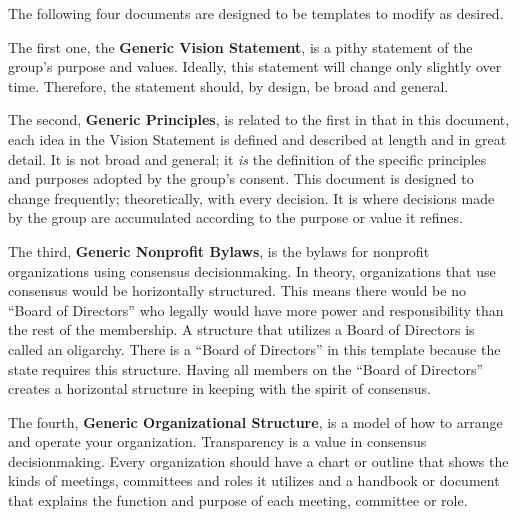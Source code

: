 
The following four documents are designed to be templates to modify as desired.
 
The first one, the \textbf{Generic Vision Statement}, is a pithy statement of the group's purpose and values. Ideally, this statement will change only slightly over time. Therefore, the statement should, by design, be broad and general.
 
The second, \textbf{Generic Principles}, is related to the first in that in this document, each idea in the Vision Statement is defined and described at length and in great detail. It is not broad and general; it \emph{is} the definition of the specific principles and purposes adopted by the group's consent. This document is designed to change frequently; theoretically, with every decision. It is where decisions made by the group are accumulated according to the purpose or value it refines.
 
The third, \textbf{Generic Nonprofit Bylaws}, is the bylaws for nonprofit organizations using consensus decisionmaking. In theory, organizations that use consensus would be horizontally structured. This means there would be no “Board of Directors” who legally would have more power and responsibility than the rest of the membership. A structure that utilizes a Board of Directors is called an oligarchy. There is a “Board of Directors” in this template because the state requires this structure. Having all members on the “Board of Directors” creates a horizontal structure in keeping with the spirit of consensus.
 
The fourth, \textbf{Generic Organizational Structure}, is a model of how to arrange and operate your organization. Transparency is a value in consensus decisionmaking. Every organization should have a chart or outline that shows the kinds of meetings, committees and roles it utilizes and a handbook or document that explains the function and purpose of each meeting, committee or role.
